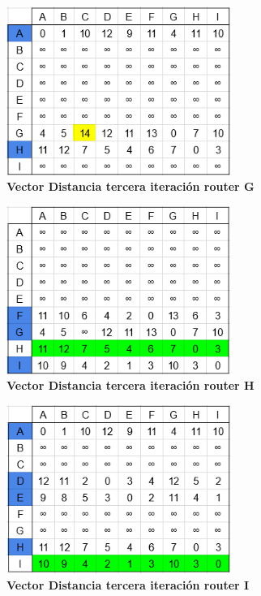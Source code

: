 \documentclass[12pt]{article}
\begin{document}
\begin{figure}[H] 
\centering 
\includegraphics[width=0.65\textwidth]{imagenes/2G3.png} \caption{\small \textbf{Vector Distancia tercera iteración router G}}
\label{fig:diagrama_41} 
\end{figure}
\begin{figure}[H] 
\centering 
\includegraphics[width=0.65\textwidth]{imagenes/2H3.png} \caption{\small \textbf{Vector Distancia tercera iteración router H}}
\label{fig:diagrama_42} 
\end{figure}
\begin{figure}[H] 
\centering 
\includegraphics[width=0.65\textwidth]{imagenes/2I3.png} \caption{\small \textbf{Vector Distancia tercera iteración router I}}
\label{fig:diagrama_43} 
\end{figure}
\end{document}

